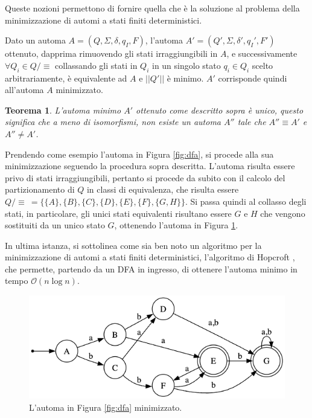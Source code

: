 \documentclass[a4paper,12pt]{report} %
\newcommand{\partitioned}[2]{#1\slash\!\!#2}  %
\newcommand{\bigo}[0]{\mathcal{O}}            %
\newtheorem{theorem}{Teorema}[chapter]        %
\begin{document}
Queste nozioni permettono di fornire quella che è la soluzione al problema della minimizzazione di automi a
stati finiti deterministici.

Dato un automa $A = (Q, \Sigma, \delta, q_I, F)$, l'automa $A' = (Q', \Sigma, \delta', q_I', F')$ ottenuto, dapprima
rimuovendo gli stati irraggiungibili in $A$, e successivamente $\forall Q_i \in \partitioned{Q}{\equiv}$ collassando gli stati
in $Q_i$ in un singolo stato $q_i \in Q_i$ scelto arbitrariamente, è equivalente ad $A$ e $||Q'||$ è minimo.
$A'$ corrisponde quindi all'automa $A$ minimizzato.

\begin{theorem}
  \label{th:unique-min-dfa}
  L'automa minimo $A'$ ottenuto come descritto sopra è unico, questo significa che a meno di isomorfismi,
  non esiste un automa $A''$ tale che $A'' \equiv A'$ e $A'' \neq A'$.
\end{theorem}

Prendendo come esempio l'automa in Figura \ref{fig:dfa}, si procede alla sua minimizzazione seguendo
la procedura sopra descritta. L'automa risulta essere privo di stati irraggiungibili,
pertanto si procede da subito con il calcolo del partizionamento di $Q$ in classi di equivalenza,
che risulta essere
$\partitioned{Q}{\equiv} \ = \{ \{A\}, \{B\}, \{C\}, \{D\}, \{E\}, \{F\}, \{G, H\}\}$.
Si passa quindi al collasso degli stati, in particolare, gli unici stati equivalenti risultano essere
$G$ e $H$ che vengono sostituiti da un unico stato $G$, ottenendo l'automa in Figura \ref{fig:minified-dfa}.

In ultima istanza, si sottolinea come sia ben noto un algoritmo per la minimizzazione di automi a stati 
finiti deterministici, l'algoritmo di Hopcroft \parencite{Hop71}, che permette, partendo da un DFA in ingresso, 
di ottenere l'automa minimo in tempo $\bigo(n \log n)$.

\begin{figure}[!htb]
  \centering
  \includegraphics[width=0.7\linewidth]{images/minified_dfa.png}
  \caption{\label{fig:minified-dfa}L'automa in Figura \ref{fig:dfa} minimizzato.}
\end{figure}
\end{document}
